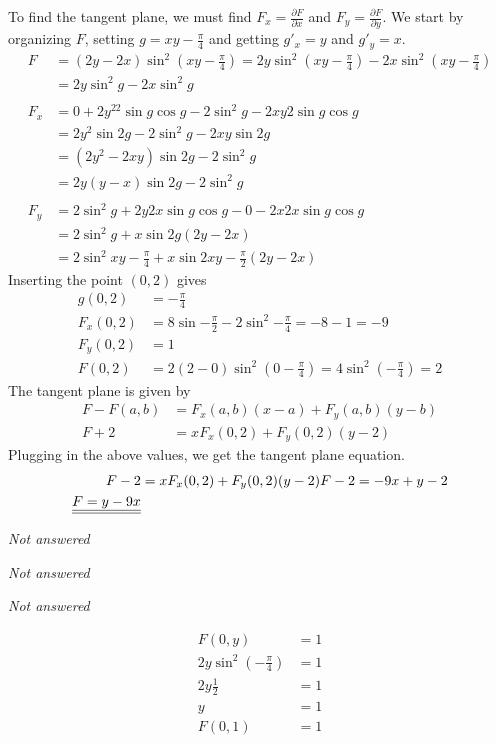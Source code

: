 \documentclass[a4paper,norsk,12pt]{article}
\begin{document}
To find the tangent plane, we must find $F_x = \frac{\partial F}{\partial x}$
and $F_y = \frac{\partial F}{\partial y}$. We start by organizing $F$, setting
$g=xy-\frac{\pi}{4}$ and getting $g'_x=y$ and $g'_y=x$.
%
\begin{align*}
  F &= (2y-2x)\sin^2{(xy-\frac{\pi}{4})}
      = 2y\sin^2{(xy-\frac{\pi}{4})} - 2x\sin^2{(xy-\frac{\pi}{4})} \\
      &= 2y\sin^2{g}-2x\sin^2{g} \\
\\
  F_x &= 0+2y^22\sin{g}\cos{g} -2\sin^2{g} - 2xy2\sin{g}\cos{g} \\
      &= 2y^2\sin{2g} - 2\sin^2{g} - 2xy\sin{2g} \\
      &= (2y^2-2xy)\sin{2g} - 2\sin^2{g} \\
      &= 2y(y-x)\sin{2g} - 2\sin^2{g} \\
\\
  F_y &= 2\sin^2{g} + 2y2x\sin{g}\cos{g} - 0 - 2x2x\sin{g}\cos{g} \\
      &= 2\sin^2{g} + x\sin{2g}(2y-2x) \\
      &= 2\sin^2{xy-\frac{\pi}{4}} + x\sin{2xy-\frac{\pi}{2}}(2y-2x)
\end{align*}
Inserting the point $(0,2)$ gives
\begin{align*}
  g(0,2) &= -\frac{\pi}{4} \\
  F_x(0,2) &= 8\sin{-\frac{\pi}{2}} - 2\sin^2{-\frac{\pi}{4}} = -8-1 = -9 \\
  F_y(0,2) &= 1 \\
  F(0,2) &= 2(2-0)\sin^2{(0-\frac{\pi}{4})} = 4\sin^2{(-\frac{\pi}{4})} = 2
\end{align*}
The tangent plane is given by
\begin{align*}
  F - F(a,b) &= F_x(a,b)(x-a) + F_y(a,b)(y-b) \\
  F + 2 &= xF_x(0,2) + F_y(0,2)(y-2)
\end{align*}
Plugging in the above values, we get the tangent plane equation.
\begin{align*}
  F - 2 &= xF_x(0,2) + F_y(0,2)(y-2)
  F - 2 = -9x + y - 2 \\
  {\underline{\underline{F = y-9x}}}
\end{align*}

\textit{Not answered}

\textit{Not answered}

\textit{Not answered}

\begin{align*}
  F(0,y) &= 1 \\
  2y \sin^2(-\frac{\pi}{4}) &= 1 \\
  2y\frac{1}{2} &= 1 \\
  y &= 1 \\
  F(0,1) &= 1
\end{align*}
\end{document}

